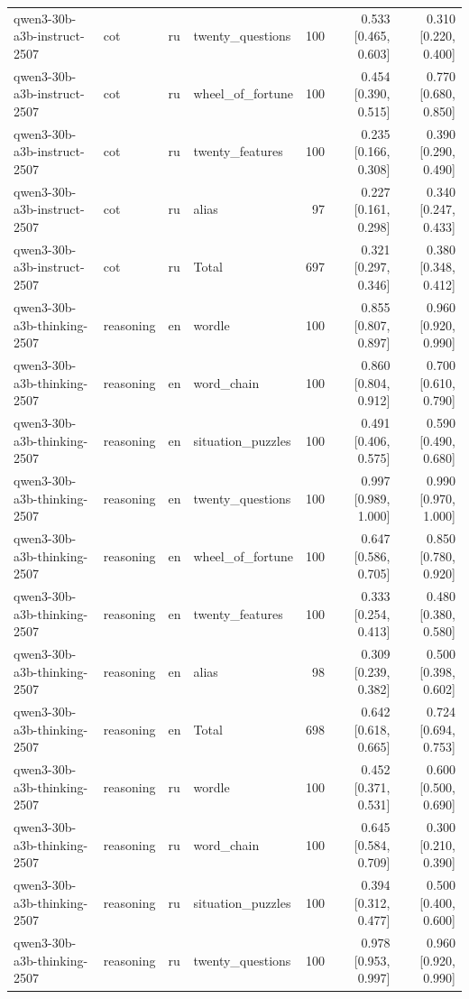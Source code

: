 \begin{longtable}{llllrrr}
qwen3-30b-a3b-instruct-2507 & cot & ru & twenty\_questions & 100 & 0.533 [0.465, 0.603] & 0.310 [0.220, 0.400] \\
qwen3-30b-a3b-instruct-2507 & cot & ru & wheel\_of\_fortune & 100 & 0.454 [0.390, 0.515] & 0.770 [0.680, 0.850] \\
qwen3-30b-a3b-instruct-2507 & cot & ru & twenty\_features & 100 & 0.235 [0.166, 0.308] & 0.390 [0.290, 0.490] \\
qwen3-30b-a3b-instruct-2507 & cot & ru & alias & 97 & 0.227 [0.161, 0.298] & 0.340 [0.247, 0.433] \\
qwen3-30b-a3b-instruct-2507 & cot & ru & Total & 697 & 0.321 [0.297, 0.346] & 0.380 [0.348, 0.412] \\
qwen3-30b-a3b-thinking-2507 & reasoning & en & wordle & 100 & 0.855 [0.807, 0.897] & 0.960 [0.920, 0.990] \\
qwen3-30b-a3b-thinking-2507 & reasoning & en & word\_chain & 100 & 0.860 [0.804, 0.912] & 0.700 [0.610, 0.790] \\
qwen3-30b-a3b-thinking-2507 & reasoning & en & situation\_puzzles & 100 & 0.491 [0.406, 0.575] & 0.590 [0.490, 0.680] \\
qwen3-30b-a3b-thinking-2507 & reasoning & en & twenty\_questions & 100 & 0.997 [0.989, 1.000] & 0.990 [0.970, 1.000] \\
qwen3-30b-a3b-thinking-2507 & reasoning & en & wheel\_of\_fortune & 100 & 0.647 [0.586, 0.705] & 0.850 [0.780, 0.920] \\
qwen3-30b-a3b-thinking-2507 & reasoning & en & twenty\_features & 100 & 0.333 [0.254, 0.413] & 0.480 [0.380, 0.580] \\
qwen3-30b-a3b-thinking-2507 & reasoning & en & alias & 98 & 0.309 [0.239, 0.382] & 0.500 [0.398, 0.602] \\
qwen3-30b-a3b-thinking-2507 & reasoning & en & Total & 698 & 0.642 [0.618, 0.665] & 0.724 [0.694, 0.753] \\
qwen3-30b-a3b-thinking-2507 & reasoning & ru & wordle & 100 & 0.452 [0.371, 0.531] & 0.600 [0.500, 0.690] \\
qwen3-30b-a3b-thinking-2507 & reasoning & ru & word\_chain & 100 & 0.645 [0.584, 0.709] & 0.300 [0.210, 0.390] \\
qwen3-30b-a3b-thinking-2507 & reasoning & ru & situation\_puzzles & 100 & 0.394 [0.312, 0.477] & 0.500 [0.400, 0.600] \\
qwen3-30b-a3b-thinking-2507 & reasoning & ru & twenty\_questions & 100 & 0.978 [0.953, 0.997] & 0.960 [0.920, 0.990] \\

\end{longtable}
